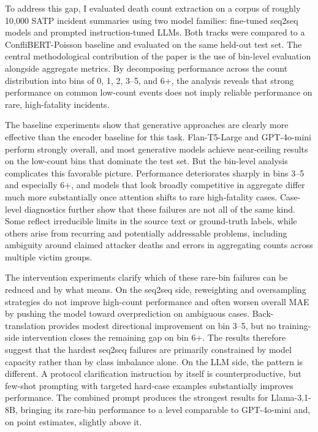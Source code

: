 \documentclass[
  11pt,
]{article}
\begin{document}
To address this gap, I evaluated death count extraction on a corpus of
roughly 10,000 SATP incident summaries using two model families:
fine-tuned seq2seq models and prompted instruction-tuned LLMs. Both
tracks were compared to a ConfliBERT-Poisson baseline and evaluated on
the same held-out test set. The central methodological contribution of
the paper is the use of bin-level evaluation alongside aggregate
metrics. By decomposing performance across the count distribution into
bins of 0, 1, 2, 3--5, and 6+, the analysis reveals that strong
performance on common low-count events does not imply reliable
performance on rare, high-fatality incidents.

The baseline experiments show that generative approaches are clearly
more effective than the encoder baseline for this task. Flan-T5-Large
and GPT-4o-mini perform strongly overall, and most generative models
achieve near-ceiling results on the low-count bins that dominate the
test set. But the bin-level analysis complicates this favorable picture.
Performance deteriorates sharply in bins 3--5 and especially 6+, and
models that look broadly competitive in aggregate differ much more
substantially once attention shifts to rare high-fatality cases.
Case-level diagnostics further show that these failures are not all of
the same kind. Some reflect irreducible limits in the source text or
ground-truth labels, while others arise from recurring and potentially
addressable problems, including ambiguity around claimed attacker deaths
and errors in aggregating counts across multiple victim groups.

The intervention experiments clarify which of these rare-bin failures
can be reduced and by what means. On the seq2seq side, reweighting and
oversampling strategies do not improve high-count performance and often
worsen overall MAE by pushing the model toward overprediction on
ambiguous cases. Back-translation provides modest directional
improvement on bin 3--5, but no training-side intervention closes the
remaining gap on bin 6+. The results therefore suggest that the hardest
seq2seq failures are primarily constrained by model capacity rather than
by class imbalance alone. On the LLM side, the pattern is different. A
protocol clarification instruction by itself is counterproductive, but
few-shot prompting with targeted hard-case examples substantially
improves performance. The combined prompt produces the strongest results
for Llama-3.1-8B, bringing its rare-bin performance to a level
comparable to GPT-4o-mini and, on point estimates, slightly above it.
\end{document}
